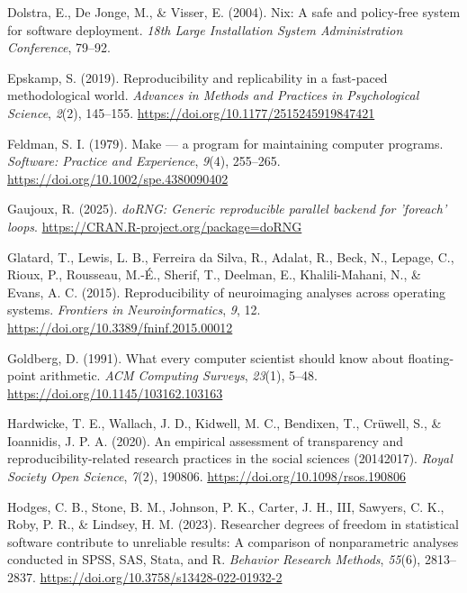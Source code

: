\documentclass[
  man,
  longtable,
  nolmodern,
  notxfonts,
  notimes,
  colorlinks=true,linkcolor=blue,citecolor=blue,urlcolor=blue]{apa7}
\newlength{\cslhangindent}
\newenvironment{CSLReferences}[2] %
 {\begin{list}{}{%
  \setlength{\itemindent}{0pt}
  \setlength{\leftmargin}{0pt}
  \setlength{\parsep}{0pt}
  \ifodd #1
   \setlength{\leftmargin}{\cslhangindent}
   \setlength{\itemindent}{-1\cslhangindent}
  \fi
  \setlength{\itemsep}{#2\baselineskip}}}
 {\end{list}}
\begin{document}
\begin{CSLReferences}{1}{0}
Dolstra, E., De Jonge, M., \& Visser, E. (2004). Nix: A safe and
policy-free system for software deployment. \emph{18th Large
Installation System Administration Conference}, 79--92.

Epskamp, S. (2019). Reproducibility and replicability in a fast-paced
methodological world. \emph{Advances in Methods and Practices in
Psychological Science}, \emph{2}(2), 145--155.
\url{https://doi.org/10.1177/2515245919847421}

Feldman, S. I. (1979). {Make} --- a program for maintaining computer
programs. \emph{Software: Practice and Experience}, \emph{9}(4),
255--265. \url{https://doi.org/10.1002/spe.4380090402}

Gaujoux, R. (2025). \emph{doRNG: Generic reproducible parallel backend
for 'foreach' loops}. \url{https://CRAN.R-project.org/package=doRNG}

Glatard, T., Lewis, L. B., Ferreira da Silva, R., Adalat, R., Beck, N.,
Lepage, C., Rioux, P., Rousseau, M.-É., Sherif, T., Deelman, E.,
Khalili-Mahani, N., \& Evans, A. C. (2015). Reproducibility of
neuroimaging analyses across operating systems. \emph{Frontiers in
Neuroinformatics}, \emph{9}, 12.
\url{https://doi.org/10.3389/fninf.2015.00012}

Goldberg, D. (1991). What every computer scientist should know about
floating-point arithmetic. \emph{ACM Computing Surveys}, \emph{23}(1),
5--48. \url{https://doi.org/10.1145/103162.103163}

Hardwicke, T. E., Wallach, J. D., Kidwell, M. C., Bendixen, T., Crüwell,
S., \& Ioannidis, J. P. A. (2020). An empirical assessment of
transparency and reproducibility-related research practices in the
social sciences (2014{\textendash}2017). \emph{Royal Society Open
Science}, \emph{7}(2), 190806. \url{https://doi.org/10.1098/rsos.190806}

Hodges, C. B., Stone, B. M., Johnson, P. K., Carter, J. H., III,
Sawyers, C. K., Roby, P. R., \& Lindsey, H. M. (2023). Researcher
degrees of freedom in statistical software contribute to unreliable
results: A comparison of nonparametric analyses conducted in {SPSS},
{SAS}, {Stata}, and {R}. \emph{Behavior Research Methods}, \emph{55}(6),
2813--2837. \url{https://doi.org/10.3758/s13428-022-01932-2}


\end{CSLReferences}
\end{document}
